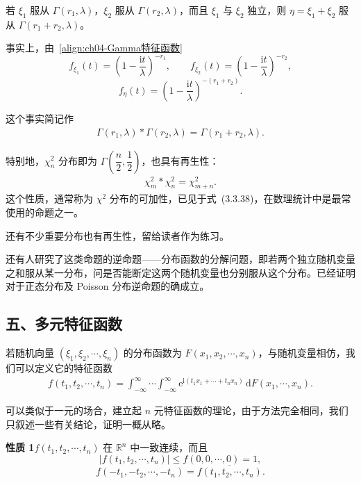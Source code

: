 \documentclass[../../main.tex]{subfiles}
\begin{document}
\begin{example}\label{example:ch04-Gamma再生}
若 $\xi_1$ 服从 $\Gamma(r_1,\lambda)$，$\xi_2$ 服从 $\Gamma(r_2,\lambda)$，而且 $\xi_1$ 与 $\xi_2$ 独立，则 $\eta=\xi_1+\xi_2$ 服从 $\Gamma(r_1+r_2,\lambda)$。

事实上，由~\eqref{align:ch04-Gamma特征函数}
\[
f_{\xi_1}(t)=\left(1-\frac{\mathrm{i}t}{\lambda}\right)^{-r_1},\qquad
f_{\xi_2}(t)=\left(1-\frac{\mathrm{i}t}{\lambda}\right)^{-r_2},
\]
\[
f_\eta(t)=\left(1-\frac{\mathrm{i}t}{\lambda}\right)^{-(r_1+r_2)}.
\]

这个事实简记作
\begin{align}
\Gamma(r_1,\lambda)*\Gamma(r_2,\lambda)=\Gamma(r_1+r_2,\lambda).\label{align:ch04-Gamma再生}
\end{align}

特别地，$\chi_n^2$ 分布即为 $\Gamma\left(\dfrac{n}{2},\dfrac12\right)$，也具有再生性：
\begin{align}
\chi_m^2*\chi_n^2=\chi_{m+n}^2.\label{align:ch04-卡方可加}
\end{align}
这个性质，通常称为 $\chi^2$ 分布的可加性，已见于式~(3.3.38)，在数理统计中是最常使用的命题之一。
\end{example}

还有不少重要分布也有再生性，留给读者作为练习。

还有人研究了这类命题的逆命题——分布函数的分解问题，即若两个独立随机变量之和服从某一分布，问是否能断定这两个随机变量也分别服从这个分布。已经证明对于正态分布及 Poisson 分布逆命题的确成立。

\subsection*{五、多元特征函数}

若随机向量 $(\xi_1,\xi_2,\cdots,\xi_n)$ 的分布函数为 $F(x_1,x_2,\cdots,x_n)$，与随机变量相仿，我们可以定义它的特征函数
\begin{align}
f(t_1,t_2,\cdots,t_n)=\int_{-\infty}^{\infty}\cdots\int_{-\infty}^{\infty}\mathrm{e}^{\mathrm{i}(t_1x_1+\cdots+t_nx_n)}\,\mathrm{d}F(x_1,\cdots,x_n).\label{align:ch04-多元特征函数定义}
\end{align}

可以类似于一元的场合，建立起 $n$ 元特征函数的理论，由于方法完全相同，我们只叙述一些有关结论，证明一概从略。

\noindent\textbf{性质 1}\quad $f(t_1,t_2,\cdots,t_n)$ 在 $\mathbb{R}^n$ 中一致连续，而且
\[
|f(t_1,t_2,\cdots,t_n)|\leqslant f(0,0,\cdots,0)=1,
\]
\[
f(-t_1,-t_2,\cdots,-t_n)=\overline{f(t_1,t_2,\cdots,t_n)}.
\]
\end{document}

